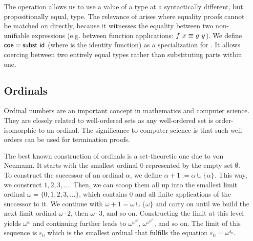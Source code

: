 \documentclass[manuscript,screen,review,anonymous]{acmart}
\begin{document}
The {} operation allows us to use a value of 
a type at a syntactically different, but propositionally equal, type.
The relevance of {} arises where equality proofs cannot be matched
on directly, because it witnesses the equality between two non-unifiable
expressions (e.g. between function applications: $f~x~\AgdaDatatype{$\equiv$}~g~y$).
We define $\AgdaFunction{coe}=\AgdaFunction{subst}~\AgdaFunction{id}$ 
(where  is the identity function) 
as a specialization for {}.
It allows coercing between two entirely equal types 
rather than substituting parts within one.


\subsection{Ordinals}
\label{sec:ordinals}

Ordinal numbers are an important concept in mathematics and computer
science. They are closely related to well-ordered sets as any
well-ordered set is order-isomorphic to an ordinal. The significance
to computer science is that such well-orders can be used for
termination proofs.

The best known construction of ordinals is a set-theoretic one due to
von Neumann. It starts with the smallest ordinal $0$ represented by
the empty set $\emptyset$. To construct the successor of an ordinal
$\alpha$, we define $\alpha+1  := \alpha \cup \{ \alpha \}$. This way,
we construct $1, 2, 3, \dots$. Then, we can scoop them all up into the
smallest limit ordinal $\omega = \{ 0, 1, 2, 3, \dots \}$, which
contains $0$ and all finite applications of the successor to it. We
continue with $\omega + 1 = \omega \cup \{ \omega \}$ and carry on
until we build the next limit ordinal $\omega \cdot 2$, then $\omega
\cdot 3$, and so on. Constructing the limit at this level yields
$\omega^\omega$ and continuing further leads to
$\omega^{\omega^\omega}$, $\omega^{\omega^{\omega^\omega}}$, and so
on. The limit of this sequence is $\varepsilon_0$ which is the
smallest ordinal that fulfills the equation
$\varepsilon_0 = \omega^{\varepsilon_0}$.
\end{document}
